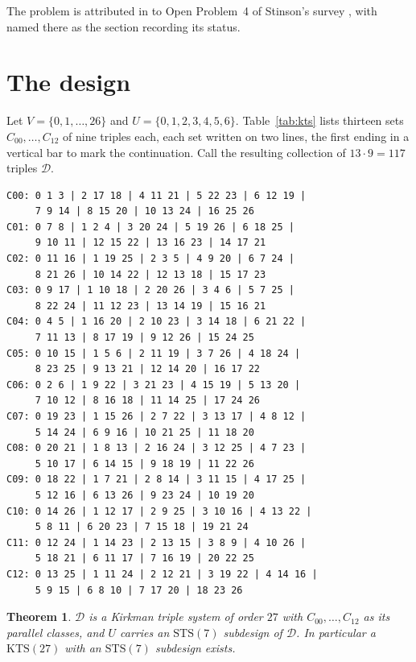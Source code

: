 \documentclass[11pt]{amsart}
\newtheorem{theorem}{Theorem}
\theoremstyle{remark}
\newcommand{\KTS}{\mathrm{KTS}}
\newcommand{\STS}{\mathrm{STS}}
\begin{document}
The problem is attributed in \cite{DL} to Open Problem~4 of Stinson's survey
\cite{Stinson}, with \cite[\S19.7]{ColbournRosa} named there as the section
recording its status.

\section{The design}\label{sec:design}

Let $V=\{0,1,\ldots,26\}$ and $U=\{0,1,2,3,4,5,6\}$. Table~\ref{tab:kts}
lists thirteen sets $C_{00},\ldots,C_{12}$ of nine triples each, each set
written on two lines, the first ending in a vertical bar to mark the
continuation. Call the resulting collection of $13\cdot 9=117$ triples $\mathcal D$.

\begin{table}[htbp]
\caption{The thirteen parallel classes. Points are $0,\ldots,26$; triples within
a class are separated by \texttt{|}, and a trailing \texttt{|} means the class
continues on the next line.}
\label{tab:kts}
\small
\begin{verbatim}
C00: 0 1 3 | 2 17 18 | 4 11 21 | 5 22 23 | 6 12 19 |
     7 9 14 | 8 15 20 | 10 13 24 | 16 25 26
C01: 0 7 8 | 1 2 4 | 3 20 24 | 5 19 26 | 6 18 25 |
     9 10 11 | 12 15 22 | 13 16 23 | 14 17 21
C02: 0 11 16 | 1 19 25 | 2 3 5 | 4 9 20 | 6 7 24 |
     8 21 26 | 10 14 22 | 12 13 18 | 15 17 23
C03: 0 9 17 | 1 10 18 | 2 20 26 | 3 4 6 | 5 7 25 |
     8 22 24 | 11 12 23 | 13 14 19 | 15 16 21
C04: 0 4 5 | 1 16 20 | 2 10 23 | 3 14 18 | 6 21 22 |
     7 11 13 | 8 17 19 | 9 12 26 | 15 24 25
C05: 0 10 15 | 1 5 6 | 2 11 19 | 3 7 26 | 4 18 24 |
     8 23 25 | 9 13 21 | 12 14 20 | 16 17 22
C06: 0 2 6 | 1 9 22 | 3 21 23 | 4 15 19 | 5 13 20 |
     7 10 12 | 8 16 18 | 11 14 25 | 17 24 26
C07: 0 19 23 | 1 15 26 | 2 7 22 | 3 13 17 | 4 8 12 |
     5 14 24 | 6 9 16 | 10 21 25 | 11 18 20
C08: 0 20 21 | 1 8 13 | 2 16 24 | 3 12 25 | 4 7 23 |
     5 10 17 | 6 14 15 | 9 18 19 | 11 22 26
C09: 0 18 22 | 1 7 21 | 2 8 14 | 3 11 15 | 4 17 25 |
     5 12 16 | 6 13 26 | 9 23 24 | 10 19 20
C10: 0 14 26 | 1 12 17 | 2 9 25 | 3 10 16 | 4 13 22 |
     5 8 11 | 6 20 23 | 7 15 18 | 19 21 24
C11: 0 12 24 | 1 14 23 | 2 13 15 | 3 8 9 | 4 10 26 |
     5 18 21 | 6 11 17 | 7 16 19 | 20 22 25
C12: 0 13 25 | 1 11 24 | 2 12 21 | 3 19 22 | 4 14 16 |
     5 9 15 | 6 8 10 | 7 17 20 | 18 23 26
\end{verbatim}
\end{table}

\begin{theorem}\label{thm:main}
$\mathcal D$ is a Kirkman triple system of order $27$ with
$C_{00},\ldots,C_{12}$ as its parallel classes, and $U$ carries an $\STS(7)$
subdesign of $\mathcal D$. In particular a $\KTS(27)$ with an $\STS(7)$
subdesign exists.
\end{theorem}
\end{document}
